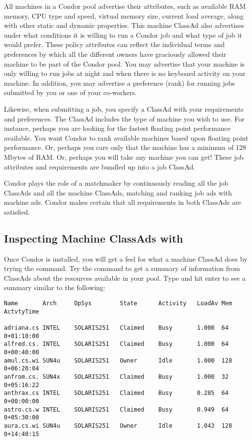 All machines in a Condor pool advertise their attributes,
such as
available RAM memory, CPU type and speed, virtual memory size, current
load average, along with other static and dynamic properties.
This machine ClassAd
also advertises under what conditions it is
willing to run a Condor job and what type of job it would prefer. These
policy attributes can reflect the individual terms and preferences by
which all the different owners have graciously allowed their machine to
be part of the Condor pool. 
You may
advertise that your machine is only willing to run jobs at night
and when there is no keyboard activity on your machine.
In addition, you may
advertise a preference (rank) for running jobs submitted by you
or one of your co-workers. 

Likewise, when submitting a job, you specify a ClassAd with
your requirements and preferences.
The ClassAd
includes the
type of machine you  wish to use. For instance, perhaps you are
looking for the fastest floating point performance available.
You want Condor to rank available machines
based upon floating point performance. Or, perhaps you
care only that the machine has a minimum of 128 Mbytes of RAM.
Or, perhaps you will
take any machine you can get! These job attributes and requirements
are bundled up into a job ClassAd.

Condor plays the role of a matchmaker by continuously reading
all the job ClassAds and all the machine ClassAds, 
matching and ranking job ads with machine ads.
Condor makes certain that all
requirements in both ClassAds are satisfied. 

\subsection{Inspecting Machine ClassAds with }

Once Condor is installed,
you will get a feel for what
a machine ClassAd does by trying
the  command.
Try the  command to get
a summary of information from
ClassAds about the resources available in your pool.
Type  and hit enter to see a summary 
similar to the following:
\begin{center}
\footnotesize
\begin{verbatim}
Name       Arch     OpSys        State      Activity   LoadAv Mem  ActvtyTime

adriana.cs INTEL    SOLARIS251   Claimed    Busy       1.000  64    0+01:10:00
alfred.cs. INTEL    SOLARIS251   Claimed    Busy       1.000  64    0+00:40:00
amul.cs.wi SUN4u    SOLARIS251   Owner      Idle       1.000  128   0+06:20:04
anfrom.cs. SUN4x    SOLARIS251   Claimed    Busy       1.000  32    0+05:16:22
anthrax.cs INTEL    SOLARIS251   Claimed    Busy       0.285  64    0+00:00:00
astro.cs.w INTEL    SOLARIS251   Claimed    Busy       0.949  64    0+05:30:00
aura.cs.wi SUN4u    SOLARIS251   Owner      Idle       1.043  128   0+14:40:15
\end{verbatim}
\normalsize
\Dots 
\end{center}


